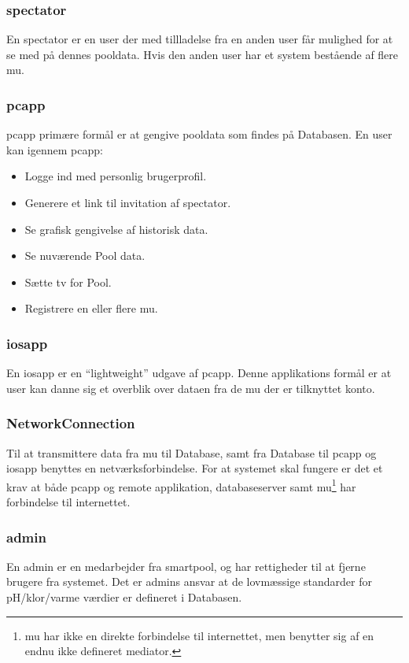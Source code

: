 
\subsubsection{\Gls{spectator}}
En \gls{spectator} er en \gls{user} der med tillladelse fra en anden \gls{user} får mulighed for at se med på dennes pooldata. Hvis den anden \gls{user} har et system bestående af flere \gls{mu}.

\subsubsection{\gls{pcapp}}
\gls{pcapp} primære formål er at gengive pooldata som findes på Databasen. En \gls{user} kan igennem \gls{pcapp}:

\begin{itemize}
	\item Logge ind med personlig brugerprofil.
	\item Generere et link til invitation af \gls{spectator}.
	\item Se grafisk gengivelse af historisk data.
	\item Se nuværende Pool data.
	\item Sætte \gls{tv} for Pool.
	\item Registrere en eller flere \gls{mu}.
\end{itemize}

\subsubsection{\gls{iosapp}}
En \gls{iosapp} er en “lightweight” udgave af \gls{pcapp}. Denne applikations formål er at \gls{user} kan danne sig et overblik over dataen fra de \gls{mu} der er tilknyttet konto.

\subsubsection{NetworkConnection}
Til at transmittere data fra \gls{mu} til Database, samt fra Database til \gls{pcapp} og \gls{iosapp} benyttes en netværksforbindelse.  For at systemet skal fungere er det et krav at både \gls{pcapp} og remote applikation, databaseserver samt \gls{mu}\footnote{  \gls{mu} har ikke en direkte forbindelse til internettet, men benytter sig af en endnu ikke defineret mediator.} har forbindelse til internettet.

\subsubsection{\gls{admin}}
En \gls{admin} er en medarbejder fra \gls{smartpool}, og har rettigheder til at fjerne brugere fra systemet. Det er \glspl{admin} ansvar at de lovmæssige standarder  for pH/klor/varme værdier er defineret i Databasen.

